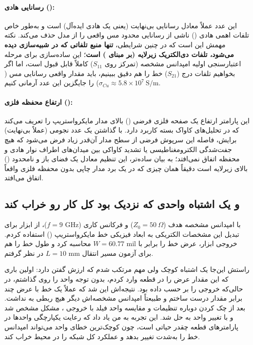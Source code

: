 \documentclass[12pt]{article}
\begin{document}
	\paragraph{رسانایی هادی ():} این عدد عملاً معادل رسانایی بی‌نهایت (یعنی یک هادی ایده‌آل) است و به‌طور خاص تلفات اهمی هادی () ناشی از رسانایی محدود مس واقعی را از مدل حذف می‌کند. نکته مهمش این است که در چنین شرایطی، \textbf{تنها منبع تلفاتی که در شبیه‌سازی دیده می‌شود، تلفات دی‌الکتریک زیرلایه (بر مبنای ) است}؛ این ساده‌سازی برای مرحله اعتبارسنجی اولیه امپدانس مشخصه (تمرکز روی $S_{11}$) کاملاً قابل قبول است، اما اگر بخواهیم تلفات درج ($S_{21}$) خط را هم دقیق ببینیم، باید مقدار واقعی رسانایی مس ($\sigma_{Cu}\approx 5.8\times10^{7}\ \text{S/m}$) را جایگزین این عدد آرمانی کنیم.
	
	\paragraph{ارتفاع محفظه فلزی ():} این پارامتر ارتفاع یک صفحه فلزی فرضی () بالای مدار مایکرواستریپ را تعریف می‌کند که در تحلیل‌های کاواک بسته کاربرد دارد. با گذاشتن یک عدد نجومی (عملاً بی‌نهایت) برایش، فاصله این سرپوش فرضی از سطح مدار آن‌قدر زیاد فرض می‌شود که هیچ جفت‌شدگی الکترومغناطیسی یا تشدید کاواکی بین میدان‌های اطراف نوار هادی و محفظه اتفاق نمی‌افتد؛ به بیان ساده‌تر، این تنظیم معادل یک فضای باز و نامحدود () بالای زیرلایه است دقیقاً همان چیزی که در یک برد مدار چاپی بدون محفظه فلزی واقعاً اتفاق می‌افتد.
	
	\subsection{ و یک اشتباه واحدی که نزدیک بود کل کار رو خراب کند}
	با امپدانس مشخصه هدف ($Z_0 = 50 \ \Omega$) و فرکانس کاری ($f = 9 \text{ GHz}$)، از ابزار  برای تبدیل این مشخصات الکتریکی به ابعاد فیزیکی خط مایکرواستریپ () استفاده کردم. خروجی ابزار، عرض خط را برابر با $W = 60.77 \text{ mil}$ محاسبه کرد و طول خط را هم برای آزمون مسیر انتقال $L = 10 \text{ mm}$ در نظر گرفتم. 
	
	راستش این‌جا یک اشتباه کوچک ولی مهم مرتکب شدم که ارزش گفتن دارد: اولین باری که این مقدار عرض را در قطعه  وارد کردم، بدون توجه واحد را روی  گذاشتم، در حالی‌که  خروجی را بر حسب  داده بود. نتیجه‌اش این شد که عملاً یک خط با عرض چند برابر مقدار درست ساختم و طبیعتاً امپدانس مشخصه‌اش دیگر هیچ ربطی به  نداشت. بعد از چک کردن دوباره تنظیمات  و مقایسه واحد فیلد  با خروجی ، مشکل مشخص شد و با تغییر واحد به  حل شد. این تجربه به من یاد داد که رعایت یکپارچگی واحدها در پارامترهای قطعه  چقدر حیاتی است، چون کوچک‌ترین خطای واحد می‌تواند امپدانس خط را به‌شدت تغییر بدهد و عملکرد کل شبکه را در محیط  خراب کند.
	
\end{document}
